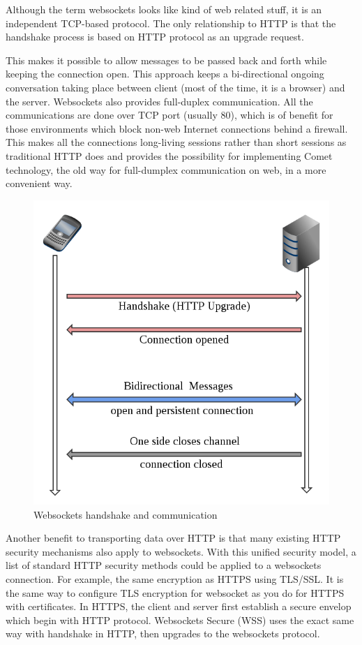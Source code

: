\documentclass[numbers,numberedpars]{sigplanconf}
\begin{document}
Although the term websockets looks like kind of web related stuff, it is an independent TCP-based protocol. The only relationship to HTTP is that the handshake process is based on HTTP protocol as an upgrade request.

This makes it possible to allow messages to be passed back and forth while keeping the connection open. This approach keeps a bi-directional ongoing conversation taking place between client (most of the time, it is a browser) and the server. Websockets also provides full-duplex communication. All the communications are done over TCP port (usually 80), which is of benefit for those environments which block non-web Internet
connections behind a firewall. This makes all the connections long-living sessions rather than short sessions as traditional HTTP does and provides the possibility for implementing Comet technology, the old way for full-dumplex communication on web, in a more convenient way.

\begin{figure}[tbph]
  \centering
  \label{fig:websocket_connection}
  \includegraphics[scale=0.3]{websocket.png}
  \caption{Websockets handshake and communication}
\end{figure}

Another benefit to transporting data over HTTP is that many existing HTTP security mechanisms also apply to websockets. With this unified security model, a list of standard HTTP security methods could be applied to a websockets connection. For example, the same encryption as HTTPS using TLS/SSL. It is the same way to configure TLS encryption for websocket as you do for HTTPS with certificates. In HTTPS, the client and server first establish a secure envelop which begin with HTTP protocol. Websockets Secure (WSS) uses
the exact same way with handshake in HTTP, then upgrades to the websockets protocol. 
\end{document}
